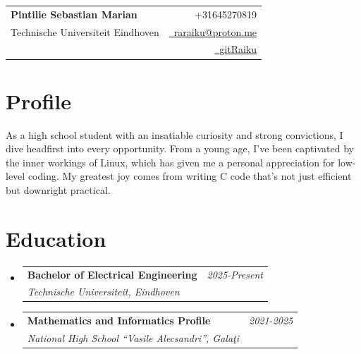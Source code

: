 \documentclass[a4paper,11pt]{article}
\makeatletter
\newcommand{\resumeSubheading}[4]{
\vspace{0.5mm}\item
    \begin{tabular*}{0.98\textwidth}[t]{l@{\extracolsep{\fill}}r}
        \textbf{#1} & \textit{\footnotesize{#4}} \\
        \textit{\footnotesize{#3}} &  \footnotesize{#2}\\
    \end{tabular*}
    \vspace{-2.4mm}
}
\newcommand{\resumeSubHeadingListStart}{\begin{itemize}[leftmargin=*,labelsep=0mm]}
\newcommand{\resumeSubHeadingListEnd}{\end{itemize}\vspace{2mm}}
\newcommand{\name}{Pintilie Sebastian Marian}
\newcommand{\phone}{+31645270819}
\newcommand{\emaila}{raraiku@proton.me}
\makeatother
\begin{document}
\selectfont

\parbox{1.55cm}{%
    \def\svgwidth{1.2cm}
    \vspace{-0.3cm}
    
}
\parbox{\dimexpr\linewidth-1.7cm\relax}{
\begin{tabularx}{\linewidth}{L r} \\
  \textbf{\Large \name} & {\raisebox{0.0\height}{\footnotesize \faPhone}\ \phone}\\
  {Technische Universiteit Eindhoven} & \href{mailto:\emaila}{\raisebox{0.0\height}{\footnotesize \faEnvelope}\ {\emaila}} \\
  &  \href{https://github.com/gitRaiku}{\raisebox{0.0\height}{\footnotesize \faGithub}\ {gitRaiku}}
\end{tabularx}
}

\vspace{-0.5cm}
\section{\textbf{Profile}}
\begin{justify}
As a high school student with an insatiable curiosity and strong convictions, I dive headfirst into every opportunity.
From a young age, I've been captivated by the inner workings of Linux, which has given me a personal appreciation for low-level coding.
My greatest joy comes from writing C code that's not just efficient but downright practical.
\end{justify}

\vspace{-0.3cm}
\section{\textbf{Education}}
  \resumeSubHeadingListStart
    \resumeSubheading
      {Bachelor of Electrical Engineering}{\vspace{-0.04cm}}
      {Technische Universiteit, Eindhoven}{2025-Present\vspace{-0.04cm}}
    \resumeSubheading
      {Mathematics and Informatics Profile}{\vspace{-0.04cm}}
      {National High School ``Vasile Alecsandri'', Galaţi}{2021-2025\vspace{-0.04cm}}
  \resumeSubHeadingListEnd
\vspace{-5.5mm}

\end{document}
